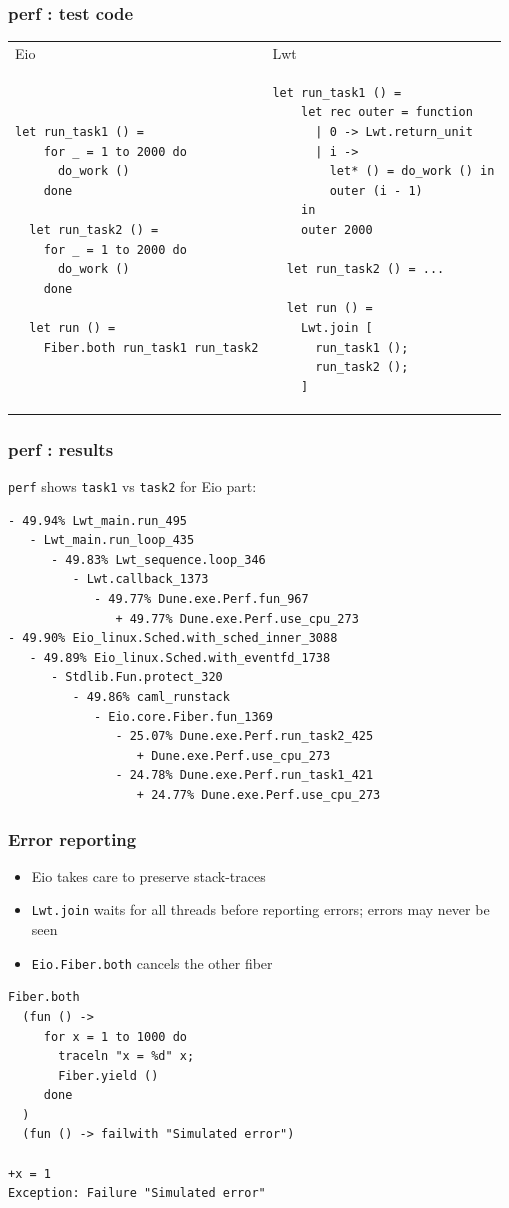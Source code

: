 \documentclass{beamer}
\begin{document}
\begin{frame}[fragile]
	\frametitle{perf : test code}
\begin{tabular}{ll}
        Eio & Lwt \\
\begin{lstlisting}[style=ocaml,boxpos=t]
  let run_task1 () =
    for _ = 1 to 2000 do
      do_work ()
    done

  let run_task2 () =
    for _ = 1 to 2000 do
      do_work ()
    done

  let run () =
    Fiber.both run_task1 run_task2
\end{lstlisting}&
\begin{lstlisting}[style=ocaml,boxpos=t]
  let run_task1 () =
    let rec outer = function
      | 0 -> Lwt.return_unit
      | i ->
        let* () = do_work () in
        outer (i - 1)
    in
    outer 2000

  let run_task2 () = ...

  let run () =
    Lwt.join [
      run_task1 ();
      run_task2 ();
    ]
\end{lstlisting}
\end{tabular}
\end{frame}

\begin{frame}[fragile]
	\frametitle{perf : results}
        \verb|perf| shows \verb|task1| vs \verb|task2| for Eio part:
	\scriptsize
\begin{verbatim}
- 49.94% Lwt_main.run_495
   - Lwt_main.run_loop_435
      - 49.83% Lwt_sequence.loop_346
         - Lwt.callback_1373
            - 49.77% Dune.exe.Perf.fun_967
               + 49.77% Dune.exe.Perf.use_cpu_273
- 49.90% Eio_linux.Sched.with_sched_inner_3088
   - 49.89% Eio_linux.Sched.with_eventfd_1738
      - Stdlib.Fun.protect_320
         - 49.86% caml_runstack
            - Eio.core.Fiber.fun_1369
               - 25.07% Dune.exe.Perf.run_task2_425
                  + Dune.exe.Perf.use_cpu_273
               - 24.78% Dune.exe.Perf.run_task1_421
                  + 24.77% Dune.exe.Perf.use_cpu_273
\end{verbatim}
\end{frame}

\begin{frame}[fragile]
	\frametitle{Error reporting}
	\begin{itemize}
		\item Eio takes care to preserve stack-traces
		\item \verb|Lwt.join| waits for all threads before reporting errors;
		      errors may never be seen
		\item \verb|Eio.Fiber.both| cancels the other fiber
	\end{itemize}
	\bigskip
	\begin{lstlisting}[style=ocaml]
Fiber.both
  (fun () ->
     for x = 1 to 1000 do
       traceln "x = %d" x;
       Fiber.yield ()
     done
  )
  (fun () -> failwith "Simulated error")

+x = 1
Exception: Failure "Simulated error"
	\end{lstlisting}
\end{frame}
\end{document}
